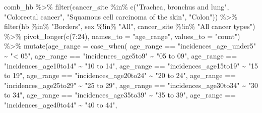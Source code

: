 \documentclass[
]{article}
\newenvironment{Shaded}{\begin{snugshade}}{\end{snugshade}}
\newcommand{\AttributeTok}[1]{\textcolor[rgb]{0.77,0.63,0.00}{#1}}
\newcommand{\DecValTok}[1]{\textcolor[rgb]{0.00,0.00,0.81}{#1}}
\newcommand{\FunctionTok}[1]{\textcolor[rgb]{0.00,0.00,0.00}{#1}}
\newcommand{\NormalTok}[1]{#1}
\newcommand{\SpecialCharTok}[1]{\textcolor[rgb]{0.00,0.00,0.00}{#1}}
\newcommand{\StringTok}[1]{\textcolor[rgb]{0.31,0.60,0.02}{#1}}
\begin{document}
\begin{Shaded}
\begin{Highlighting}[]
\NormalTok{comb\_hb }\SpecialCharTok{\%\textgreater{}\%} 
  \FunctionTok{filter}\NormalTok{(cancer\_site }\SpecialCharTok{\%in\%} \FunctionTok{c}\NormalTok{(}\StringTok{"Trachea, bronchus and lung"}\NormalTok{,}
                            \StringTok{"Colorectal cancer"}\NormalTok{,}
                            \StringTok{"Squamous cell carcinoma of the skin"}\NormalTok{,}
                            \StringTok{"Colon"}\NormalTok{)) }\SpecialCharTok{\%\textgreater{}\%}
  \FunctionTok{filter}\NormalTok{(hb }\SpecialCharTok{\%in\%} \StringTok{"Borders"}\NormalTok{,}
\NormalTok{         sex }\SpecialCharTok{\%!in\%} \StringTok{"All"}\NormalTok{,}
\NormalTok{         cancer\_site }\SpecialCharTok{\%!in\%} \StringTok{"All cancer types"}\NormalTok{) }\SpecialCharTok{\%\textgreater{}\%} 
  \FunctionTok{pivot\_longer}\NormalTok{(}\FunctionTok{c}\NormalTok{(}\DecValTok{7}\SpecialCharTok{:}\DecValTok{24}\NormalTok{),}
               \AttributeTok{names\_to =} \StringTok{"age\_range"}\NormalTok{,}
               \AttributeTok{values\_to =} \StringTok{"count"}\NormalTok{) }\SpecialCharTok{\%\textgreater{}\%}
  \FunctionTok{mutate}\NormalTok{(}\AttributeTok{age\_range =} \FunctionTok{case\_when}\NormalTok{(}
\NormalTok{    age\_range }\SpecialCharTok{==} \StringTok{"incidences\_age\_under5"} \SpecialCharTok{\textasciitilde{}} \StringTok{"\textless{} 05"}\NormalTok{,}
\NormalTok{    age\_range }\SpecialCharTok{==} \StringTok{"incidences\_age5to9"} \SpecialCharTok{\textasciitilde{}} \StringTok{"05 to 09"}\NormalTok{,}
\NormalTok{    age\_range }\SpecialCharTok{==} \StringTok{"incidences\_age10to14"} \SpecialCharTok{\textasciitilde{}} \StringTok{"10 to 14"}\NormalTok{,}
\NormalTok{    age\_range }\SpecialCharTok{==} \StringTok{"incidences\_age15to19"} \SpecialCharTok{\textasciitilde{}} \StringTok{"15 to 19"}\NormalTok{,}
\NormalTok{    age\_range }\SpecialCharTok{==} \StringTok{"incidences\_age20to24"} \SpecialCharTok{\textasciitilde{}} \StringTok{"20 to 24"}\NormalTok{,}
\NormalTok{    age\_range }\SpecialCharTok{==} \StringTok{"incidences\_age25to29"} \SpecialCharTok{\textasciitilde{}} \StringTok{"25 to 29"}\NormalTok{,}
\NormalTok{    age\_range }\SpecialCharTok{==} \StringTok{"incidences\_age30to34"} \SpecialCharTok{\textasciitilde{}} \StringTok{"30 to 34"}\NormalTok{,}
\NormalTok{    age\_range }\SpecialCharTok{==} \StringTok{"incidences\_age35to39"} \SpecialCharTok{\textasciitilde{}} \StringTok{"35 to 39"}\NormalTok{,}
\NormalTok{    age\_range }\SpecialCharTok{==} \StringTok{"incidences\_age40to44"} \SpecialCharTok{\textasciitilde{}} \StringTok{"40 to 44"}\NormalTok{,}

\end{Highlighting}
\end{Shaded}
\end{document}
